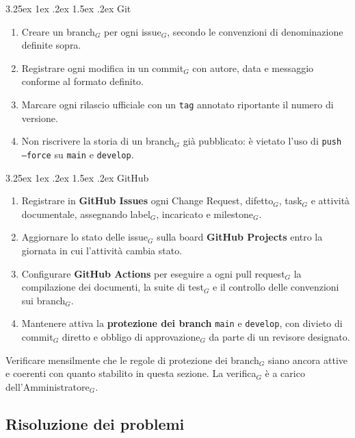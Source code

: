 \documentclass[a4paper, 10pt]{article}
\makeatletter
\renewcommand\paragraph{\@startsection{paragraph}{4}{\z@}%
  {3.25ex \@plus1ex \@minus .2ex}%
  {1.5ex \@plus .2ex}%
  {\normalfont\normalsize\bfseries}}
\makeatother
\begin{document}
\paragraph{Git}
\begin{enumerate}
    \item Creare un branch$_G$ per ogni issue$_G$, secondo le convenzioni di denominazione definite sopra.
    \item Registrare ogni modifica in un commit$_G$ con autore, data e messaggio conforme al formato definito.
    \item Marcare ogni rilascio ufficiale con un \texttt{tag} annotato riportante il numero di versione.
    \item Non riscrivere la storia di un branch$_G$ già pubblicato: è vietato l'uso di \texttt{push --force} su \texttt{main} e \texttt{develop}.
\end{enumerate}

\paragraph{GitHub}
\begin{enumerate}
    \item Registrare in \textbf{GitHub Issues} ogni Change Request, difetto$_G$, task$_G$ e attività documentale, assegnando label$_G$, incaricato e milestone$_G$.
    \item Aggiornare lo stato delle issue$_G$ sulla board \textbf{GitHub Projects} entro la giornata in cui l'attività cambia stato.
    \item Configurare \textbf{GitHub Actions} per eseguire a ogni pull request$_G$ la compilazione dei documenti, la suite di test$_G$ e il controllo delle convenzioni sui branch$_G$.
    \item Mantenere attiva la \textbf{protezione dei branch} \texttt{main} e \texttt{develop}, con divieto di commit$_G$ diretto e obbligo di approvazione$_G$ da parte di un revisore designato.
\end{enumerate}

\noindent Verificare mensilmente che le regole di protezione dei branch$_G$ siano ancora attive e coerenti con quanto stabilito in questa sezione. La verifica$_G$ è a carico dell'Amministratore$_G$.

\subsection{Risoluzione dei problemi}
\label{subsec:risoluzione_problemi}
\end{document}

